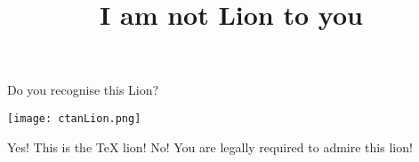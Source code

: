 \documentclass{webquiz}
\title{I am not Lion to you}
\begin{document}
  \begin{question}
    Do you recognise this Lion?
    \begin{center}
        \texttt{[image: ctanLion.png]}
    \end{center}
    \begin{choice}
      \correct Yes!  \feedback This is the \TeX{} lion!
      \incorrect No! \feedback You are legally required to admire this lion!
    \end{choice}
  \end{question}
\end{document}
